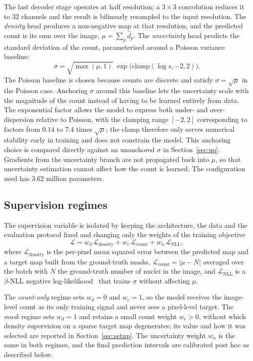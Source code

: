 \documentclass[pdflatex,sn-mathphys-num]{sn-jnl}
\begin{document}
The last decoder stage operates at half resolution; a $3\times3$ convolution reduces it to $32$ channels and
the result is bilinearly resampled to the input resolution. The \emph{density} head produces a non-negative map
at that resolution, and the predicted count is its sum over the image, $\mu = \sum_p \hat d_p$. The \emph{uncertainty} head predicts the standard deviation of the count,
parameterised around a Poisson variance baseline:
\begin{equation}
\sigma = \sqrt{\max(\mu,1)}\;\exp\!\big(\mathrm{clamp}(\log s,-2,2)\big).
\end{equation}
The Poisson baseline is chosen because counts are discrete and satisfy $\sigma = \sqrt{\mu}$ in the Poisson
case. Anchoring $\sigma$ around this baseline lets the uncertainty scale with the magnitude of the count
instead of having to be learned entirely from data. The exponential factor allows the model to express both
under- and over-dispersion relative to Poisson, with the clamping range $[-2, 2]$ corresponding to factors from
$0.14$ to $7.4$ times $\sqrt{\mu}$; the clamp therefore only serves numerical stability early in training and
does not constrain the model. This anchoring choice is compared directly against an unanchored $\sigma$ in
Section~\ref{sec:uq}. Gradients from the uncertainty branch are not propagated back into $\mu$, so that
uncertainty estimation cannot affect how the count is learned. The configuration used has $3.62$ million
parameters.

\subsection{Supervision regimes}
The supervision variable is isolated by keeping the architecture, the data and the evaluation protocol fixed
and changing only the weights of the training objective
\begin{equation}
\mathcal{L} = w_d\,\mathcal{L}_{\text{density}} + w_c\,\mathcal{L}_{\text{count}}
+ w_{n}\,\mathcal{L}_{\text{NLL}},
\end{equation}
where $\mathcal{L}_{\text{density}}$ is the per-pixel mean squared error between the predicted map and a target
map built from the ground-truth masks, $\mathcal{L}_{\text{count}} = |\mu - N|$ averaged over the batch with
$N$ the ground-truth number of nuclei in the image, and $\mathcal{L}_{\text{NLL}}$ is a $\beta$-NLL negative
log-likelihood~\cite{bnll} that trains $\sigma$ without affecting $\mu$.

The \emph{count-only} regime sets $w_d = 0$ and $w_c = 1$, so the model receives the image-level count as its
only training signal and never sees a pixel-level target. The \emph{mask} regime sets $w_d = 1$ and retains a
small count weight $w_c > 0$, without which density supervision on a sparse target map degenerates; its value
and how it was selected are reported in Section~\ref{sec:setup}. The uncertainty weight $w_n$ is the same in
both regimes, and the final prediction intervals are calibrated post hoc as described below.
\end{document}

